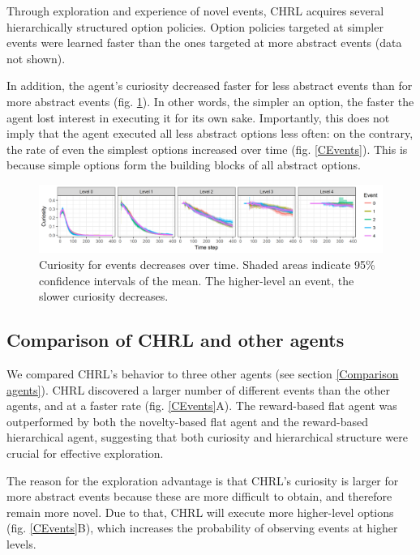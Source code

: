 \documentclass{article}
\begin{document}
Through exploration and experience of novel events, CHRL acquires several hierarchically structured option policies. Option policies targeted at simpler events were learned faster than the ones targeted at more abstract events (data not shown).

In addition, the agent's curiosity decreased faster for less abstract events than for more abstract events (fig. \ref{CuriosityFigure}). In other words, the simpler an option, the faster the agent lost interest in executing it for its own sake. Importantly, this does not imply that the agent executed all less abstract options less often: on the contrary, the rate of even the simplest options increased over time (fig. \ref{CEvents}). This is because simple options form the building blocks of all abstract options.

\begin{figure}[h]
	\centering
	\includegraphics[width=\linewidth]{ACuriosity.png}
	\caption{Curiosity for events decreases over time. Shaded areas indicate 95\% confidence intervals of the mean. The higher-level an event, the slower curiosity decreases.}
	\label{CuriosityFigure}
\end{figure}

\subsection{Comparison of CHRL and other agents} \label{Results compare all}

We compared CHRL's behavior to three other agents (see section \ref{Comparison agents}). CHRL discovered a larger number of different events than the other agents, and at a faster rate (fig. \ref{CEvents}A). The reward-based flat agent was outperformed by both the novelty-based flat agent and the reward-based hierarchical agent, suggesting that both curiosity and hierarchical structure were crucial for effective exploration.

The reason for the exploration advantage is that CHRL's curiosity is larger for more abstract events because these are more difficult to obtain, and therefore remain more novel. Due to that, CHRL will execute more higher-level options (fig. \ref{CEvents}B), which increases the probability of observing events at higher levels. 
\end{document}
